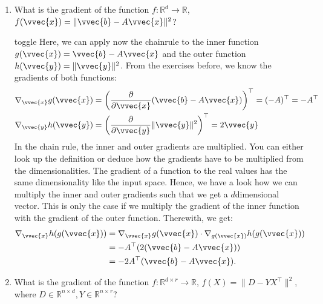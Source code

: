 \documentclass[letterpaper,10pt,english]{jupyterBook}
\begin{document}
\begin{enumerate}
\begin{sphinxuseclass}{toggle}
\end{sphinxuseclass}
\item {} 
\sphinxAtStartPar
What is the gradient of the function \(f:\mathbb{R}^d\rightarrow \mathbb{R}\), \(f(\vvec{x}) = \lVert \vvec{b}-A\vvec{x}\rVert^2 \)?

\begin{sphinxuseclass}{toggle}
\sphinxAtStartPar
Here, we can apply now the chainrule to the inner function \(g(\vvec{x})= \vvec{b}-A\vvec{x}\) and the outer function \(h(\vvec{y})=\lVert \vvec{y}\rVert^2\). From the exercises before, we know the gradients of both functions:
\begin{align*}
    \nabla_\vvec{x} g(\vvec{x}) 
    &= \left(\frac{\partial}{\partial \vvec{x}}(\vvec{b}-A\vvec{x})\right)^\top = (-A)^\top = -A^\top\\
    \nabla_\vvec{y} h(\vvec{y}) 
    &= \left(\frac{\partial}{\partial \vvec{y}}\lVert\vvec{y}\rVert^2\right)^\top=2\vvec{y}
\end{align*}
\sphinxAtStartPar
In the chain rule, the inner and outer gradients are multiplied. You can either look up the definition or deduce how the gradients have to be multiplied from the dimensionalities. The gradient of a function to the real values has the same dimensionality like the input space. Hence, we have a look how we can multiply the inner and outer gradients such that we get a \(d\)\sphinxhyphen{}dimensional vector. This is only the case if we multiply the gradient of the inner function with the gradient of the outer function. Therewith, we get:
\begin{align*}
    \nabla_\vvec{x} h(g(\vvec{x}))
    &= \nabla_\vvec{x} g(\vvec{x})\cdot \nabla_{g(\vvec{x})}h(g(\vvec{x}))\\
    &= -A^\top(2(\vvec{b}-A\vvec{x}))\\
    &= -2A^\top(\vvec{b}-A\vvec{x}).
\end{align*}
\end{sphinxuseclass}
\item {} 
\sphinxAtStartPar
What is the gradient of the function \(f:\mathbb{R}^{d\times r}\rightarrow \mathbb{R}\), \(f(X)=\lVert D - YX^\top\rVert^2\), where \(D\in\mathbb{R}^{n\times d}, Y\in\mathbb{R}^{n\times r}\)?


\end{enumerate}
\end{document}
